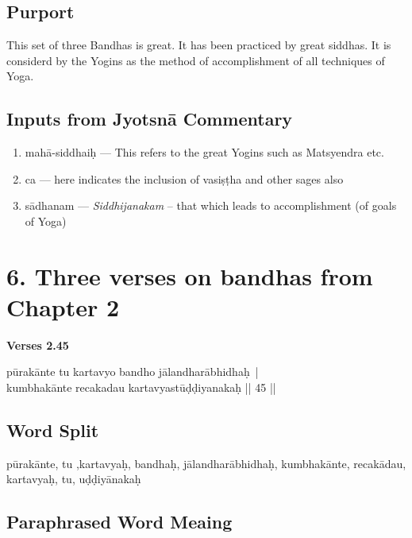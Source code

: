 \subsection*{Purport}
\vspace{-5pt}

This set of three Bandhas is great. It has been practiced by great siddhas. It is considerd by the Yogins as the method of accomplishment of all techniques of Yoga.

\subsection*{Inputs from Jyotsnā Commentary}
\vspace{-5pt}

\begin{enumerate}
\itemsep=0pt
\item mahā-siddhaiḥ --- This refers to the great Yogins such as Matsyendra etc.
\item ca --- here indicates the inclusion of vasiṣṭha and other sages also
\item sādhanam --- \textit{Siddhijanakam} – that which leads to accomplishment (of goals of Yoga)
\end{enumerate}

\section*{6. Three verses on bandhas from Chapter 2}

\noindent \textbf{Verses 2.45}

\begin{shloka}
pūrakānte tu kartavyo bandho jālandharābhidhaḥ |\\
kumbhakānte recakadau kartavyastūḍḍiyanakaḥ || 45 ||
\end{shloka}

\subsection*{Word Split}

pūrakānte, tu ,kartavyaḥ, bandhaḥ, jālandharābhidhaḥ, kumbhakānte, recakādau, kartavyaḥ, tu, uḍḍiyānakaḥ

\subsection*{Paraphrased Word Meaing}

